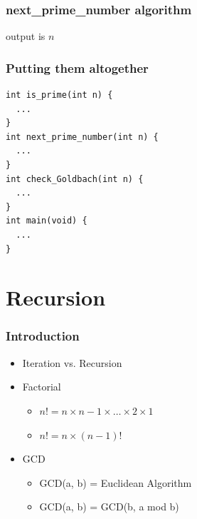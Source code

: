 \documentclass{../c-lecture}
\begin{document}
\begin{frame}[fragile]
  \frametitle{next\_prime\_number algorithm}
  \begin{algorithm}[H]
  output is $n$\;
  \end{algorithm}
\end{frame}

\begin{frame}[fragile]
  \frametitle{Putting them altogether}
  \begin{verbatim}
int is_prime(int n) {
  ...
}
int next_prime_number(int n) {
  ...
}
int check_Goldbach(int n) {
  ...
}
int main(void) {
  ...
}
  \end{verbatim}
\end{frame}

\section{Recursion}

\begin{frame}
  \frametitle{Introduction}
  \begin{itemize}
    \item Iteration vs. Recursion
    \item Factorial
    \begin{itemize}
      \item $n! = n \times n-1 \times \ldots \times 2 \times 1$
      \item $n! = n \times (n-1)!$
    \end{itemize}
    \item GCD
    \begin{itemize}
      \item GCD(a, b) = Euclidean Algorithm
      \item GCD(a, b) = GCD(b, a mod b)
    \end{itemize}
  \end{itemize}
\end{frame}
\end{document}
